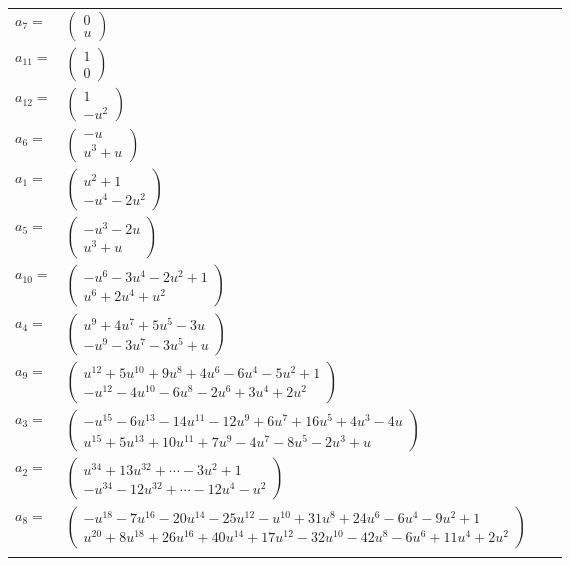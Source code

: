\documentclass[1p]{elsarticle_modified}
\theoremstyle{definition}
\begin{document}
\begin{tabular}{m{7pt} m{180pt} m{7pt} m{180pt} }
\flushright $a_{7}=$&$\begin{pmatrix}0\\u\end{pmatrix}$ \\
\flushright $a_{11}=$&$\begin{pmatrix}1\\0\end{pmatrix}$ \\
\flushright $a_{12}=$&$\begin{pmatrix}1\\- u^2\end{pmatrix}$ \\
\flushright $a_{6}=$&$\begin{pmatrix}- u\\u^3+u\end{pmatrix}$ \\
\flushright $a_{1}=$&$\begin{pmatrix}u^2+1\\- u^4-2 u^2\end{pmatrix}$ \\
\flushright $a_{5}=$&$\begin{pmatrix}- u^3-2 u\\u^3+u\end{pmatrix}$ \\
\flushright $a_{10}=$&$\begin{pmatrix}- u^6-3 u^4-2 u^2+1\\u^6+2 u^4+u^2\end{pmatrix}$ \\
\flushright $a_{4}=$&$\begin{pmatrix}u^9+4 u^7+5 u^5-3 u\\- u^9-3 u^7-3 u^5+u\end{pmatrix}$ \\
\flushright $a_{9}=$&$\begin{pmatrix}u^{12}+5 u^{10}+9 u^8+4 u^6-6 u^4-5 u^2+1\\- u^{12}-4 u^{10}-6 u^8-2 u^6+3 u^4+2 u^2\end{pmatrix}$ \\
\flushright $a_{3}=$&$\begin{pmatrix}- u^{15}-6 u^{13}-14 u^{11}-12 u^9+6 u^7+16 u^5+4 u^3-4 u\\u^{15}+5 u^{13}+10 u^{11}+7 u^9-4 u^7-8 u^5-2 u^3+u\end{pmatrix}$ \\
\flushright $a_{2}=$&$\begin{pmatrix}u^{34}+13 u^{32}+\cdots-3 u^2+1\\- u^{34}-12 u^{32}+\cdots-12 u^4- u^2\end{pmatrix}$ \\
\flushright $a_{8}=$&$\begin{pmatrix}- u^{18}-7 u^{16}-20 u^{14}-25 u^{12}- u^{10}+31 u^8+24 u^6-6 u^4-9 u^2+1\\u^{20}+8 u^{18}+26 u^{16}+40 u^{14}+17 u^{12}-32 u^{10}-42 u^8-6 u^6+11 u^4+2 u^2\end{pmatrix}$\\&\end{tabular}
\end{document}

